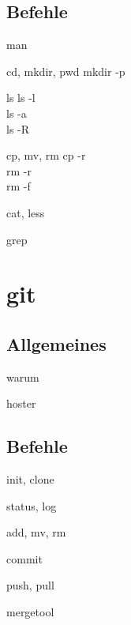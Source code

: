\documentclass[t]{beamer}
\begin{document}
    \subsection{Befehle}
      \begin{frame}{man}
      \end{frame}
      \begin{frame}{cd, mkdir, pwd}
        mkdir -p
      \end{frame}
      \begin{frame}{ls}
        ls -l\\
        ls -a\\
        ls -R
      \end{frame}
      \begin{frame}{cp, mv, rm}
        cp -r\\
        rm -r\\
        rm -f
      \end{frame}
      \begin{frame}{cat, less}
      \end{frame}
      \begin{frame}{grep}
      \end{frame}
  \section{git}
    \subsection{Allgemeines}
      \begin{frame}{warum}
      \end{frame}
      \begin{frame}{hoster}
      \end{frame}
    \subsection{Befehle}
      \begin{frame}{init, clone}
      \end{frame}
      \begin{frame}{status, log}
      \end{frame}
      \begin{frame}{add, mv, rm}
      \end{frame}
      \begin{frame}{commit}
      \end{frame}
      \begin{frame}{push, pull}
      \end{frame}
      \begin{frame}{mergetool}
      \end{frame}
\end{document}
